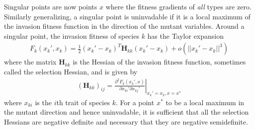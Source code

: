 Singular points are now points $x$ where the fitness gradients of \textit{all} types are zero. 
Similarly generalizing, a singular point is uninvadable if it is a local maximum of the invasion fitness function in the direction of the mutant variables. 
Around a singular point, the invasion fitness of species $k$ has the Taylor expansion
\begin{align}
	F_k(x_k',x_k) = \frac{1}{2}(x_k'-x_k)^T \mathbf{H}_{kk} (x_k'-x_k) + o(||x_k'-x_k||^3)
\end{align}
where the matrix $\mathbf{H}_{kk}$ is the Hessian of the invasion fitness function, sometimes called the selection Hessian, and is given by
\begin{align}
	(\mathbf{H}_{kk})_{ij} = \left. \frac{\partial^2 F_k(x_k',x)}{\partial x_{ki}' \partial x_{kj}'} 
	\right|_{x_k'=x_k,x=x^*}
\end{align}
where $x_{ki}$ is the $i$th trait of species $k$. 
For a point $x^*$ to be a local maximum in the mutant direction and hence uninvadable, it is sufficient that all the selection Hessians are negative definite and necessary that they are negative semidefinite. 

